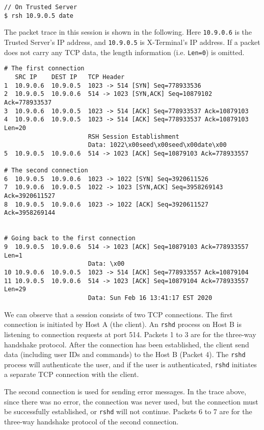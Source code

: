\begin{lstlisting}
// On Trusted Server
$ rsh 10.9.0.5 date
\end{lstlisting}
 
The packet trace in this \rsh session is shown in the following. 
Here \texttt{10.9.0.6} is the Trusted Server's IP address, 
and \texttt{10.9.0.5} is X-Terminal's IP address.
If a packet does not carry any TCP data, the length information (i.e.
\texttt{Len=0}) is omitted. 

\begin{lstlisting}[caption={Packet trace of a \rsh session},
                  label={listing:rsh}]
# The first connection
   SRC IP    DEST IP   TCP Header
1  10.9.0.6  10.9.0.5  1023 -> 514 [SYN] Seq=778933536 
2  10.9.0.5  10.9.0.6  514 -> 1023 [SYN,ACK] Seq=10879102 Ack=778933537 
3  10.9.0.6  10.9.0.5  1023 -> 514 [ACK] Seq=778933537 Ack=10879103 
4  10.9.0.6  10.9.0.5  1023 -> 514 [ACK] Seq=778933537 Ack=10879103 Len=20
                       RSH Session Establishment
                       Data: 1022\x00seed\x00seed\x00date\x00
5  10.9.0.5  10.9.0.6  514 -> 1023 [ACK] Seq=10879103 Ack=778933557

# The second connection
6  10.9.0.5  10.9.0.6  1023 -> 1022 [SYN] Seq=3920611526 
7  10.9.0.6  10.9.0.5  1022 -> 1023 [SYN,ACK] Seq=3958269143 Ack=3920611527 
8  10.9.0.5  10.9.0.6  1023 -> 1022 [ACK] Seq=3920611527 Ack=3958269144 


# Going back to the first connection
9  10.9.0.5  10.9.0.6  514 -> 1023 [ACK] Seq=10879103 Ack=778933557 Len=1
                       Data: \x00
10 10.9.0.6  10.9.0.5  1023 -> 514 [ACK] Seq=778933557 Ack=10879104 
11 10.9.0.5  10.9.0.6  514 -> 1023 [ACK] Seq=10879104 Ack=778933557 Len=29
                       Data: Sun Feb 16 13:41:17 EST 2020
\end{lstlisting}


We can observe that a \rsh session consists of two TCP connections.  
The first connection is initiated by Host A (the client). 
An \texttt{rshd} process on Host B is listening to connection requests at port 514. 
Packets 1 to 3 are for the three-way handshake protocol. 
After the connection has been established, the client 
send \rsh data (including user IDs and commands) to the Host B (Packet 4).
The \texttt{rshd} process will authenticate the user, and 
if the user is authenticated, \texttt{rshd} initiates a
separate TCP connection with the client. 


The second connection is used for sending error messages. 
In the trace above, since there was no error, the connection was never used, 
but the connection must be successfully established, or \texttt{rshd} 
will not continue. Packets 6 to 7 are for the three-way handshake protocol
of the second connection. 


